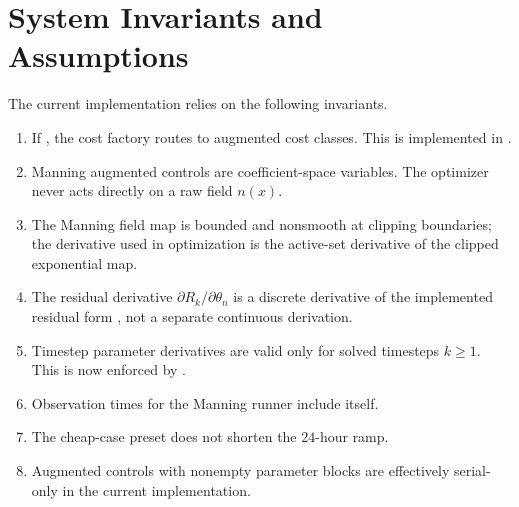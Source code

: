 \documentclass[11pt]{article}
\begin{document}
\section{System Invariants and Assumptions}
The current implementation relies on the following invariants.
\begin{enumerate}
\item If , the cost factory routes to augmented cost classes. This is implemented in .
\item Manning augmented controls are coefficient-space variables. The optimizer never acts directly on a raw field $n(x)$.
\item The Manning field map is bounded and nonsmooth at clipping boundaries; the derivative used in optimization is the active-set derivative of the clipped exponential map.
\item The residual derivative \(\partial R_k / \partial \theta_n\) is a discrete derivative of the implemented residual form , not a separate continuous derivation.
\item Timestep parameter derivatives are valid only for solved timesteps \(k \ge 1\). This is now enforced by .
\item Observation times for the Manning runner include  itself.
\item The cheap-case preset does not shorten the $24$-hour ramp.
\item Augmented controls with nonempty parameter blocks are effectively serial-only in the current implementation.
\end{enumerate}
\end{document}
